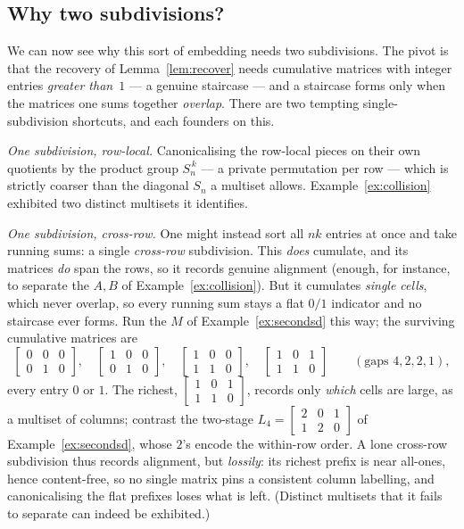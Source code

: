\documentclass[11pt,a4paper]{article}
\theoremstyle{definition}
\theoremstyle{plain}
\newcommand{\Sn}{S_n}
\begin{document}
\subsection{Why two subdivisions?}
\label{sec:whytwo}

We can now see why this sort of embedding needs two subdivisions.  The pivot is that the recovery of
Lemma~\ref{lem:recover} needs cumulative matrices with integer entries
\emph{greater than~$1$} --- a genuine staircase --- and a staircase forms only
when the matrices one sums together \emph{overlap}. There are two tempting
single-subdivision shortcuts, and each founders on this.

\emph{One subdivision, row-local.} Canonicalising the row-local pieces on their
own quotients by the product group $\Sn^{\,k}$ --- a private permutation per row
--- which is strictly coarser than the diagonal $\Sn$ a multiset allows.
Example~\ref{ex:collision} exhibited two distinct multisets it identifies.

\emph{One subdivision, cross-row.} One might instead sort all $nk$ entries at
once and take running sums: a single \emph{cross-row} subdivision. This
\emph{does} cumulate, and its matrices \emph{do} span the rows, so it records
genuine alignment (enough, for instance, to separate the $A,B$ of
Example~\ref{ex:collision}). But it cumulates \emph{single cells}, which never
overlap, so every running sum stays a flat $0/1$ indicator and no staircase ever
forms. Run the $M$ of Example~\ref{ex:secondsd} this way; the surviving
cumulative matrices are
\[
 \left[\begin{smallmatrix}0&0&0\\0&1&0\end{smallmatrix}\right],\quad
 \left[\begin{smallmatrix}1&0&0\\0&1&0\end{smallmatrix}\right],\quad
 \left[\begin{smallmatrix}1&0&0\\1&1&0\end{smallmatrix}\right],\quad
 \left[\begin{smallmatrix}1&0&1\\1&1&0\end{smallmatrix}\right]
 \qquad(\text{gaps }4,2,2,1),
\]
every entry $0$ or $1$. The richest,
$\left[\begin{smallmatrix}1&0&1\\1&1&0\end{smallmatrix}\right]$, records only
\emph{which} cells are large, as a multiset of columns; contrast the two-stage
$L_4=\left[\begin{smallmatrix}2&0&1\\1&2&0\end{smallmatrix}\right]$ of
Example~\ref{ex:secondsd}, whose $2$'s encode the within-row order. A lone
cross-row subdivision thus records alignment, but \emph{lossily}: its richest
prefix is near all-ones, hence content-free, so no single matrix pins a
consistent column labelling, and canonicalising the flat prefixes loses what is
left. (Distinct multisets that it fails to separate can indeed be exhibited.)
\end{document}
